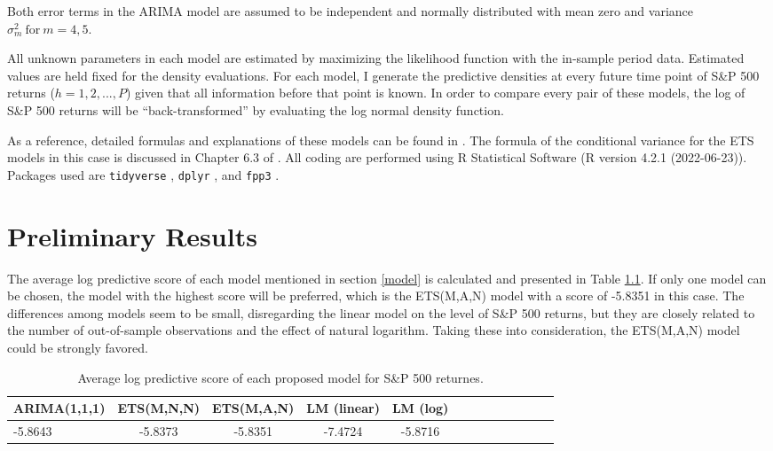 \documentclass{monashthesis}
\begin{document}
Both error terms in the ARIMA model are assumed to be independent and normally distributed with mean zero and variance \(\sigma_m^2 \ \text{for}\  m = 4,5\).

All unknown parameters in each model are estimated by maximizing the likelihood function with the in-sample period data. Estimated values are held fixed for the density evaluations. For each model, I generate the predictive densities at every future time point of S\&P 500 returns (\(h=1,2,...,P\)) given that all information before that point is known. In order to compare every pair of these models, the log of S\&P 500 returns will be ``back-transformed'' by evaluating the log normal density function.

As a reference, detailed formulas and explanations of these models can be found in \textcite{fpp3}. The formula of the conditional variance for the ETS models in this case is discussed in Chapter 6.3 of \textcite{HKOS08}. All coding are performed using R Statistical Software (R version 4.2.1 (2022-06-23)). Packages used are \texttt{tidyverse} \autocite{tidy19}, \texttt{dplyr} \autocite{dplyr23}, and \texttt{fpp3} \autocite{fpp23}.

\hypertarget{preliminary-results}{%
\chapter{Preliminary Results}\label{preliminary-results}}

The average log predictive score of each model mentioned in section \ref{model} is calculated and presented in Table \ref{tab:1}. If only one model can be chosen, the model with the highest score will be preferred, which is the ETS(M,A,N) model with a score of -5.8351 in this case. The differences among models seem to be small, disregarding the linear model on the level of S\&P 500 returns, but they are closely related to the number of out-of-sample observations and the effect of natural logarithm. Taking these into consideration, the ETS(M,A,N) model could be strongly favored.

\vspace{0.3cm}

\begin{table}[htbp!]
\centering
\caption{Average log predictive score of each proposed model for S\&P 500 returnes.}
\begin{tabular}{l*{4}{c}cccccccc}
\hline
     ARIMA(1,1,1) & ETS(M,N,N) & ETS(M,A,N) & LM (linear) & LM (log) \\
    \hline
     -5.8643 & -5.8373  & -5.8351 & -7.4724 & -5.8716\\
    \hline
\end{tabular}
\label{tab:1}
\end{table}
\end{document}
